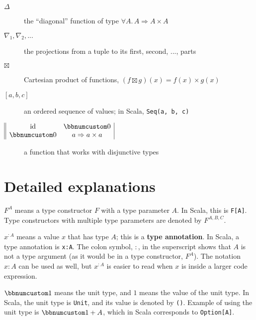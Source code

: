 \begin{description}
\item [{$\Delta$}] the ``diagonal'' function of type $\forall A.\,A\Rightarrow A\times A$
\item [{$\nabla_{1},\nabla_{2},...$}] the projections from a tuple to
its first, second, ..., parts
\item [{$\boxtimes$}] Cartesian product of functions, $(f\boxtimes g)(x)=f(x)\times g(x)$
\item [{$\left[a,b,c\right]$}] an ordered sequence of values; in Scala,
\lstinline!Seq(a, b, c)!
\item [{$\begin{array}{||cc|}
\text{id} & \bbnum 0\\
\bbnum 0 & a\Rightarrow a\times a
\end{array}$}] a function that works with disjunctive types
\end{description}

\section{Detailed explanations}

$F^{A}$ means a type constructor $F$ with a type parameter $A$.
In Scala, this is \lstinline!F[A]!.
Type constructors with multiple type parameters are denoted by $F^{A,B,C}$.

$x^{:A}$ means a value $x$ that has type $A$; this is a \textbf{type
annotation}. In Scala, a type annotation is \lstinline!x:A!.
The colon symbol, $:$, in the superscript shows that $A$ is not
a type argument (as it would be in a type constructor, $F^{A}$).
The notation $x:A$ can be used as well, but $x^{:A}$ is easier to
read when $x$ is inside a larger code expression. 

$\bbnum 1$ means the unit type, and $1$ means
the value of the unit type. In Scala, the unit type is \lstinline!Unit!,
and its value is denoted by \lstinline!()!.
Example of using the unit type is $\bbnum 1+A$, which in Scala corresponds
to \lstinline!Option[A]!.

